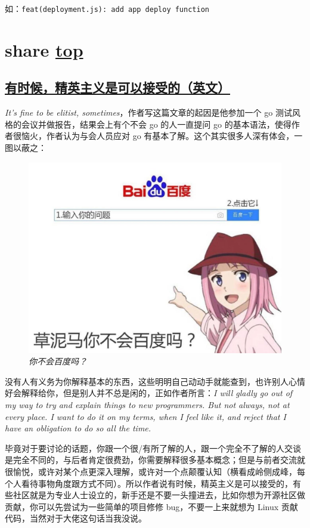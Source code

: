如：\lstinline{feat(deployment.js): add app deploy function}

\section{share \hyperref[chap:w4]{top}}\label{w4:share}

\subsection{\href{https://www.arp242.net/elitist.html}{有时候，精英主义是可以接受的（英文）}}

\textit{It's fine to be elitist, sometimes}，作者写这篇文章的起因是他参加一个 go 测试风格的会议并做报告，结果会上有个不会 go 的人一直提问 go 的基本语法，使得作者很恼火，作者认为与会人员应对 go 有基本了解。这个其实很多人深有体会，一图以蔽之：

\begin{figure}[htbp]
  \centering
    \includegraphics[width=\textwidth]{../images/2020/11/w4-share-1.jpg}
  \caption{\textit{你不会百度吗？}}
\end{figure}

没有人有义务为你解释基本的东西，这些明明自己动动手就能查到，也许别人心情好会解释给你，但是别人并不总是闲的，正如作者所言：\textit{I will gladly go out of my way to try and explain things to new programmers. But not always, not at every place. I want to do it on my terms, when I feel like it, and reject that I have an obligation to do so all the time.}

毕竟对于要讨论的话题，你跟一个很/有所了解的人，跟一个完全不了解的人交谈是完全不同的，与后者肯定很费劲，你需要解释很多基本概念；但是与前者交流就很愉悦，或许对某个点更深入理解，或许对一个点颠覆认知（横看成岭侧成峰，每个人看待事物角度跟方式不同）。所以作者说有时候，精英主义是可以接受的，有些社区就是为专业人士设立的，新手还是不要一头撞进去，比如你想为开源社区做贡献，你可以先尝试为一些简单的项目修修 bug，不要一上来就想为 Linux 贡献代码，当然对于大佬这句话当我没说。

